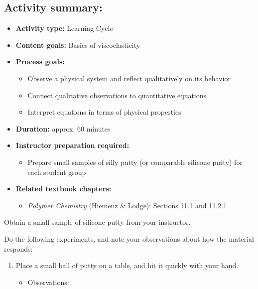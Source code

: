 \begin{activity}
\begin{instructornotes}
	\subsection*{Activity summary:}
	\begin{itemize}
		\item \textbf{Activity type:} Learning Cycle
		\item \textbf{Content goals:} Basics of viscoelasticity
		\item \textbf{Process goals:} %
			\begin{itemize}
				\item Observe a physical system and reflect qualitatively on its behavior
				\item Connect qualitative observations to quantitative equations
				\item Interpret equations in terms of physical properties 
			\end{itemize}
		\item \textbf{Duration:} approx. 60 minutes
		\item \textbf{Instructor preparation required:} 
			\begin{itemize}
				\item Prepare small samples of silly putty (or comparable silicone putty) for each student group
			\end{itemize}
		\item \textbf{Related textbook chapters:}
			\begin{itemize}
				\item \emph{Polymer Chemistry} (Hiemenz \& Lodge): Sections 11.1 and 11.2.1
			\end{itemize}
	\end{itemize}

\end{instructornotes}


\begin{model}
\label{model:sillyputty}

	Obtain a small sample of silicone putty from your instructor.
	
	Do the following experiments, and note your observations about how the material responds:
	
	\begin{enumerate}
		\item Place a small ball of putty on a table, and hit it quickly with your hand.
			\begin{itemize}
				\item Observations:
				

\end{itemize}
\end{enumerate}
\end{model}
\end{activity}
